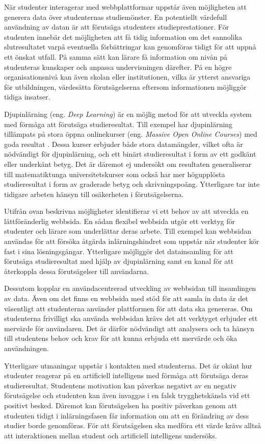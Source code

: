 När studenter interagerar med webbplattformar uppstår även möjligheten att generera data över studenternas studiemönster. En potentiellt värdefull användning av datan är att förutsäga studenters studieprestationer. För studenten innebär det möjligheten att få tidig information om det sannolika slutresultatet varpå eventuella förbättringar kan genomföras tidigt för att uppnå ett önskat utfall. På samma sätt kan lärare få information om nivån på studenteras kunskaper och anpassa undervisningen därefter. På en högre organisationsnivå kan även skolan eller institutionen, vilka är ytterst ansvariga för utbildningen, värdesätta förutsägelserna eftersom informationen möjliggör tidiga insatser.

Djupinlärning (eng. \emph{Deep Learning}) är en möjlig metod för att utveckla system med förmåga att förutsäga studieresultat. Till exempel har djupinlärning tillämpats på stora öppna onlinekurser (eng. \emph{Massive Open Online Courses}) med goda resultat \cite{Kim2018GritNetSP}. Dessa kurser erbjuder både stora datamängder, vilket ofta är nödvändigt för djupinlärning, och ett binärt studieresultat i form av ett godkänt eller underkänt betyg. Det är däremot ej undersökt om resultaten generaliserar till matematiktunga universitetskurser som också har mer högupplösta studieresultat i form av graderade betyg och skrivningspoäng. Ytterligare tar inte tidigare arbeten hänsyn till osäkerheten i förutsägelserna.

Utifrån ovan beskrivna möjligheter identifierar vi ett behov av att utveckla en lättföränderlig webbsida. En sådan flexibel webbsida utgör ett verktyg för studenter och lärare som underlättar deras arbete. Till exempel kan webbsidan användas för att försöka åtgärda inlärningshindret som uppstår när studenter kör fast i sina lösningsgångar. Ytterligare möjliggör det datainsamling för att förutsäga studieresultat med hjälp av djupinlärning samt en kanal för att återkoppla dessa förutsägelser till användarna.

Dessutom kopplar en användacentrerad utveckling av webbsidan till insamlingen av data. Även om det finns en webbsida med stöd för att samla in data är det väsentligt att studenterna använder plattformen för att data ska genereras. Om studenterna frivilligt ska använda webbsidan krävs det att verktyget erbjuder ett mervärde för användaren. Det är därför nödvändigt att analysera och ta hänsyn till studentens behov och krav för att kunna erbjuda ett mervärde och öka användningen.

Ytterligare utmaningar uppstår i kontakten med studenterna. Det är okänt hur studenter reagerar på en artificiell intelligens med förmåga att förutsäga deras studieresultat. Studentens motivation kan påverkas negativt av en negativ förutsägelse och studenten kan även invaggas i en falsk trygghetskänsla vid ett positivt besked. Däremot kan förutsägelsen ha positiv påverkan genom att studenten tidigt i inlärningsfasen får information om att en förändring av dess studier borde genomföras. För att förutsägelsen ska medföra ett värde krävs alltså att interaktionen mellan student och artificiell intelligens undersöks.

